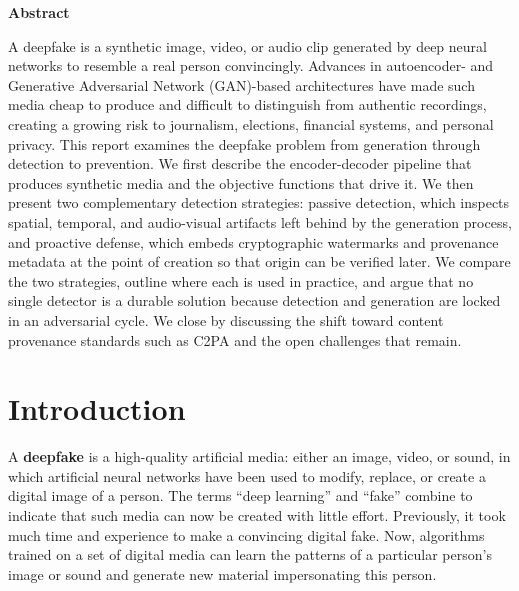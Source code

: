 \documentclass[a4paper,12pt]{article}
\begin{document}
\vspace{0.5cm}

\begin{center}
    \begin{large}
        \textbf{Abstract} \\[0.5cm]
    \end{large}
    \begin{minipage}{0.85\textwidth}
        \justify
        A deepfake is a synthetic image, video, or audio clip generated by deep neural networks to resemble a real person convincingly. Advances in autoencoder- and Generative Adversarial Network (GAN)-based architectures have made such media cheap to produce and difficult to distinguish from authentic recordings, creating a growing risk to journalism, elections, financial systems, and personal privacy. This report examines the deepfake problem from generation through detection to prevention. We first describe the encoder-decoder pipeline that produces synthetic media and the objective functions that drive it. We then present two complementary detection strategies: passive detection, which inspects spatial, temporal, and audio-visual artifacts left behind by the generation process, and proactive defense, which embeds cryptographic watermarks and provenance metadata at the point of creation so that origin can be verified later. We compare the two strategies, outline where each is used in practice, and argue that no single detector is a durable solution because detection and generation are locked in an adversarial cycle. We close by discussing the shift toward content provenance standards such as C2PA and the open challenges that remain.
    \end{minipage}
\end{center}

\vspace{0.5cm}


\section{Introduction}
\label{sec:introduction}

A \textbf{deepfake} is a high-quality artificial media: either an image, video, or sound, in which artificial neural networks have been used to modify, replace, or create a digital image of a person. The terms ``deep learning'' and ``fake'' combine to indicate that such media can now be created with little effort. Previously, it took much time and experience to make a convincing digital fake. Now, algorithms trained on a set of digital media can learn the patterns of a particular person's image or sound and generate new material impersonating this person.
\vspace{4pt}
\end{document}
